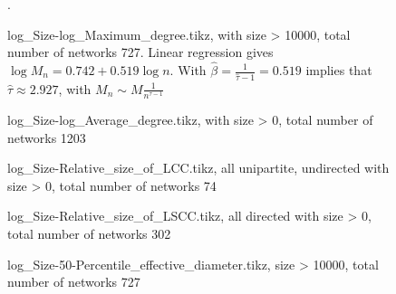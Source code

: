\documentclass[fleqn]{article}
\begin{document}
	\begin{figure}[!htb]
		\centering
		
		\caption{log\_Size-log\_Maximum\_degree.tikz, with size > 10000, total number of networks 727. Linear regression gives $\log{M_n} = 0.742 + 0.519\log{n}$. With $\hat{\beta} = \frac{1}{\hat{\tau} -1} = 0.519$ implies that $\hat{\tau} \approx 2.927$, with $M_{n} \sim M \frac{1}{n^{\tau -1}}$}.
	\end{figure}
	
	\begin{figure}[!htb]
		\centering
		
		\caption{log\_Size-log\_Average\_degree.tikz, with size > 0, total number of networks 1203}
	\end{figure}

	\begin{figure}[!htb]
		\centering
		
		\caption{log\_Size-Relative\_size\_of\_LCC.tikz, all unipartite, undirected with size > 0, total number of networks 74}
	\end{figure}

	\begin{figure}[!htb]
		\centering
		
		\caption{log\_Size-Relative\_size\_of\_LSCC.tikz,  all directed with size > 0, total number of networks 302}
	\end{figure}

	\begin{figure}[!htb]
		\centering
		
		\caption{log\_Size-50-Percentile\_effective\_diameter.tikz, size > 10000, total number of networks 727}
	\end{figure}
	
\end{document}

